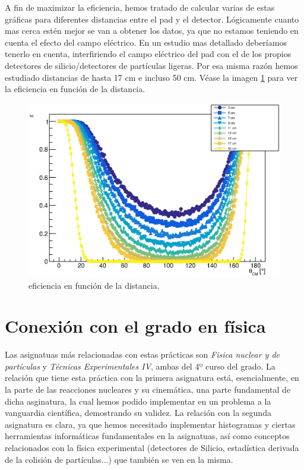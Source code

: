 \documentclass[12pt,a4paper]{article}
\numberwithin{equation}{section}
\numberwithin{figure}{section}
\begin{document}
A fin de maximizar la eficiencia, hemos tratado de calcular varias de estas gráficas para diferentes distancias entre el pad y el detector. Lógicamente cuanto mas cerca estén mejor se van a obtener los datos, ya que no estamos teniendo en cuenta el efecto del campo eléctrico. En un estudio mas detallado deberíamos tenerlo en cuenta, interfiriendo el campo eléctrico del pad con el de los propios detectores de silicio/detectores de partículas ligeras. Por esa misma razón hemos estudiado distancias de hasta 17 cm e incluso 50 cm. Véase la imagen \ref{Fig:2.4-Efficiencia} para ver la eficiencia en función de la distancia. 

\begin{figure}[h!] \centering
    \includegraphics[scale=0.8]{Eff.eps}
    \caption{eficiencia en función de la distancia.}
    \label{Fig:2.4-Efficiencia}
\end{figure}



\section{Conexión con el grado en física}

Las asignatuas más relacionadas con estas prácticas son {\it Fisica nuclear y de partículas} y {\it Técnicas Experimentales IV}, ambas del 4º curso del grado. La relación que tiene esta práctica con la primera asignatura está, esencialmente, en la parte de las reacciones nucleares y su cinemática, una parte fundamental de dicha asginatura, la cual hemos podido implementar en un problema a la vanguardia científica, demostrando su validez. La relación con la segunda asignatura es clara, ya que hemos necesitado implementar histogramas y ciertas herramientas informáticas fundamentales en la asignatuas, así como conceptos relacionados con la física experimental (detectores de Silicio, estadística derivada de la colisión de partículas...) que también se ven en la misma. 
\end{document}
